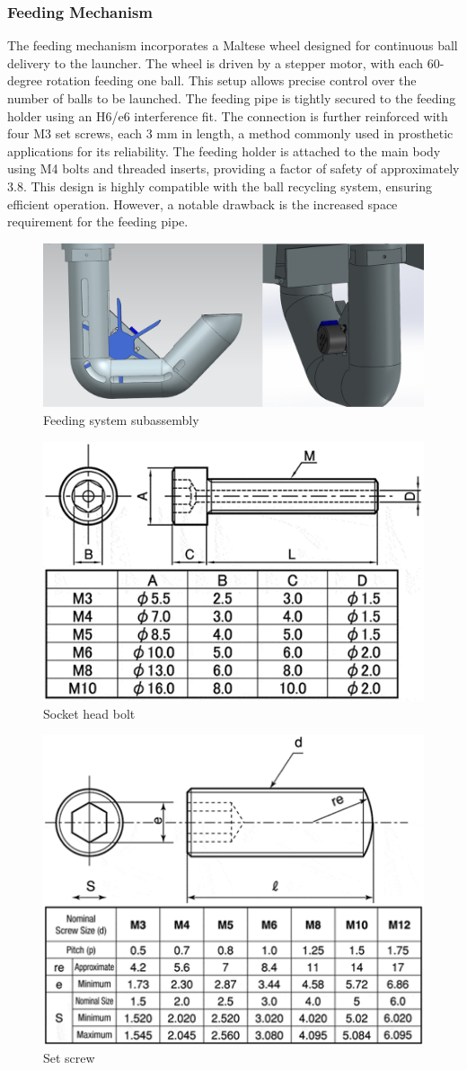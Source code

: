 \documentclass[12pt]{article}
\begin{document}
\subsubsection{Feeding Mechanism}
The feeding mechanism incorporates a Maltese wheel designed for continuous ball delivery to the launcher. The wheel is driven by a stepper motor, with each 60-degree rotation feeding one ball. This setup allows precise control over the number of balls to be launched.
The feeding pipe is tightly secured to the feeding holder using an H6/e6 interference fit. The connection is further reinforced with four M3 set screws, each 3 mm in length, a method commonly used in prosthetic applications for its reliability. The feeding holder is attached to the main body using M4 bolts and threaded inserts, providing a factor of safety of approximately 3.8.
This design is highly compatible with the ball recycling system, ensuring efficient operation. However, a notable drawback is the increased space requirement for the feeding pipe.

\begin{figure}[h!]
    \centering
    \includegraphics[width=0.7\linewidth]{2.3.4.1.png}
    \caption{Feeding system subassembly}
    \label{fig:enter-label}
\end{figure}

\begin{figure}[h!]
    \centering
    \includegraphics[width=0.5\linewidth]{2.3.4.2.png}
    \caption{Socket head bolt}
    \label{fig:enter-label}
\end{figure}

\begin{figure}[h!]
    \centering
    \includegraphics[width=0.5\linewidth]{2.3.4.3.png}
    \caption{Set screw}
    \label{fig:enter-label}
\end{figure}
\end{document}
